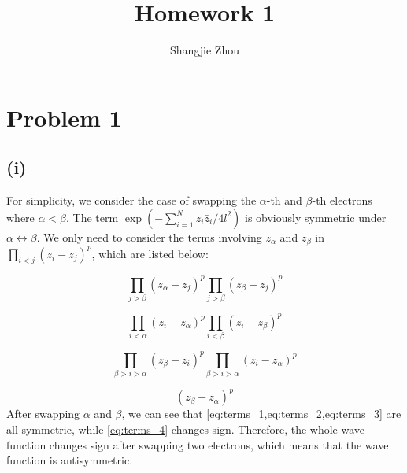 \documentclass{article}
\title{Homework 1}
\author{Shangjie Zhou}
\begin{document}
\maketitle


\section*{Problem 1}
\subsection*{(i)}
For simplicity, we consider the case of swapping the $\alpha$-th and $\beta$-th electrons where $\alpha<\beta$.
The term $\exp(-\sum_{i=1}^Nz_i \bar{z}_i/4l^2)$ is obviously symmetric under $\alpha\leftrightarrow \beta$.
We only need to consider the terms involving $z_\alpha$ and $z_\beta$ in $\prod_{i<j}(z_i-z_j)^p$, which are listed below:

\begin{equation}\label{eq:terms_1}
    \prod_{j>\beta}(z_\alpha-z_j)^p\prod_{j>\beta}(z_\beta-z_j)^p
\end{equation}


\begin{equation}\label{eq:terms_2}
    \prod_{i<\alpha}(z_i-z_\alpha)^p\prod_{i<\beta}(z_i-z_\beta)^p
\end{equation}

\begin{equation}\label{eq:terms_3}
    \prod_{\beta>i>\alpha}(z_\beta-z_i)^p\prod_{\beta>i>\alpha}(z_i-z_\alpha)^p
\end{equation}

\begin{equation}\label{eq:terms_4}
    (z_\beta-z_\alpha)^p
\end{equation}
After swapping $\alpha$ and $\beta$, we can see that \cref{eq:terms_1,eq:terms_2,eq:terms_3} are all symmetric, while \cref{eq:terms_4} changes sign.
Therefore, the whole wave function changes sign after swapping two electrons, which means that the wave function is antisymmetric.
\end{document}
